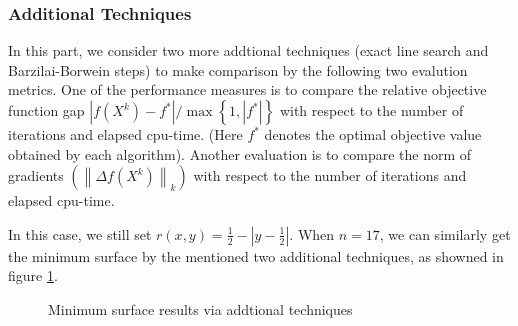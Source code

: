 \subsubsection{Additional Techniques}
In this part, we consider two more addtional techniques (exact line search and Barzilai-Borwein steps) to make comparison by the following two evalution metrics. One of the performance measures is to compare the relative objective function gap $\left|f\left(X^{k}\right)-f^{*}\right| / \max \left\{1,\left|f^{*}\right|\right\}$ with respect to the number of iterations and elapsed cpu-time. (Here $f^{*}$ denotes the optimal objective value obtained by each algorithm). Another evaluation is to compare the norm of gradients $\left(\left\|\Delta f\left(X^{k}\right)\right\|_{k}\right)$ with respect to the number of iterations and elapsed cpu-time.

In this case, we still set $r(x, y)=\frac{1}{2}-\left|y-\frac{1}{2}\right|$. When $n=17$, we can similarly get the minimum surface by the mentioned two additional techniques, as showned in figure \ref{fig:add_performance}.
\begin{figure}[!htbp]
    \centering
    
    \caption{Minimum surface results via addtional techniques}
    \label{fig:add_performance}  
\end{figure}

